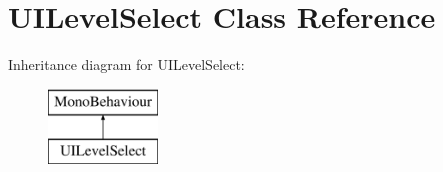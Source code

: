 \hypertarget{class_u_i_level_select}{\section{U\+I\+Level\+Select Class Reference}
\label{class_u_i_level_select}
}
Inheritance diagram for U\+I\+Level\+Select\+:\begin{figure}[H]
\begin{center}
\leavevmode
\includegraphics[height=2.000000cm]{class_u_i_level_select}
\end{center}
\end{figure}
